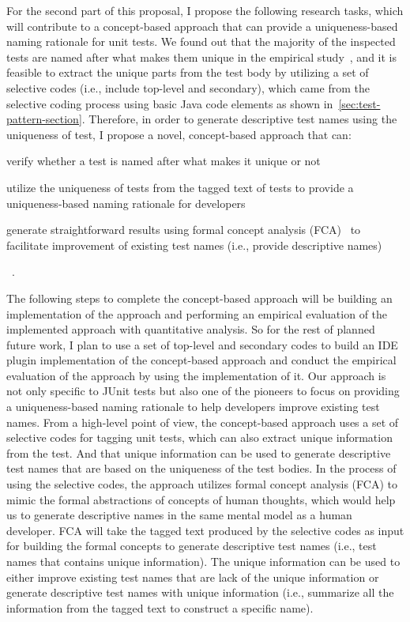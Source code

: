 For the second part of this proposal, I propose the following research tasks, which will contribute to a concept-based approach that can provide a uniqueness-based naming rationale for unit tests.
% 
We found out that the majority of the inspected tests are named after what makes them unique in the empirical study~\cite{emp-study}, and it is feasible to extract the unique parts from the test body by utilizing a set of selective codes (i.e., include top-level and secondary), which came from the selective coding process using basic Java code elements as shown in~\cref{sec:test-pattern-section}.
%
Therefore, in order to generate descriptive test names using the uniqueness of test, I propose a novel, concept-based approach that can:
%
\begin{enumerate*}
\item verify whether a test is named after what makes it unique or not
\item utilize the uniqueness of tests from the tagged text of tests to provide a uniqueness-based naming rationale for developers
\item generate straightforward results using formal concept analysis (FCA)~\cite{ganter2012formal} to facilitate improvement of existing test names (i.e., provide descriptive names)
\end{enumerate*}~\cite{emp-study}.


The following steps to complete the concept-based approach will be building an implementation of the approach and performing an empirical evaluation of the implemented approach with quantitative analysis.
%
So for the rest of planned future work, I plan to use a set of top-level and secondary codes to build an IDE plugin implementation of the concept-based approach and conduct the empirical evaluation of the approach by using the implementation of it.
%
Our approach is not only specific to JUnit tests but also one of the pioneers to focus on providing a uniqueness-based naming rationale to help developers improve existing test names.
%
From a high-level point of view, the concept-based approach uses a set of selective codes for tagging unit tests, which can also extract unique information from the test.
%
And that unique information can be used to generate descriptive test names that are based on the uniqueness of the test bodies.
%
In the process of using the selective codes, the approach utilizes formal concept analysis (FCA) to mimic the formal abstractions of concepts of human thoughts, which would help us to generate descriptive names in the same mental model as a human developer.
%
FCA will take the tagged text produced by the selective codes as input for building the formal concepts to generate descriptive test names (i.e., test names that contains unique information).
%
The unique information can be used to either improve existing test names that are lack of the unique information or generate descriptive test names with unique information (i.e., summarize all the information from the tagged text to construct a specific name).


